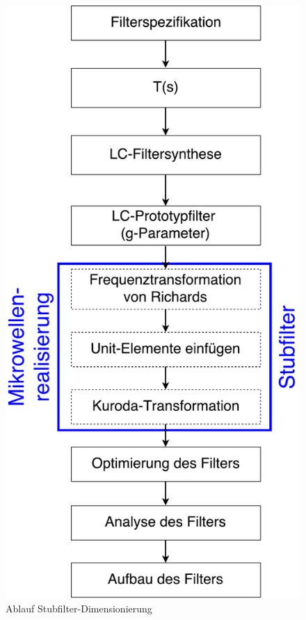 \begin{figure}[h!]
\centering
 	\includegraphics[width=\imagewidth]{images/Ablauf_Filterdimensionierung.pdf}
 	\caption{Ablauf Stubfilter-Dimensionierung}
 	\label{fig:Ablauf_Filterdimensionierung}
\end{figure}

\clearpage


\clearpage

